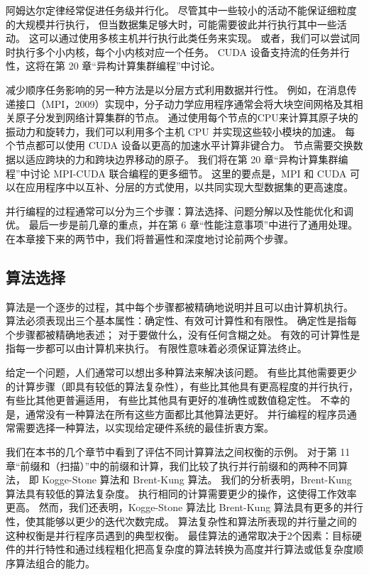阿姆达尔定律经常促进任务级并行化。 尽管其中一些较小的活动不能保证细粒度的大规模并行执行，
但当数据集足够大时，可能需要彼此并行执行其中一些活动。 这可以通过使用多核主机并行执行此类任务来实现。 
或者，我们可以尝试同时执行多个小内核，每个小内核对应一个任务。 
CUDA 设备支持流的任务并行性，这将在第 20 章“异构计算集群编程”中讨论。

减少顺序任务影响的另一种方法是以分层方式利用数据并行性。 
例如，在消息传递接口（MPI，2009）实现中，分子动力学应用程序通常会将大块空间网格及其相关原子分发到网络计算集群的节点。 
通过使用每个节点的CPU来计算其原子块的振动力和旋转力，我们可以利用多个主机 CPU 并实现这些较小模块的加速。 
每个节点都可以使用 CUDA 设备以更高的加速水平计算非键合力。 节点需要交换数据以适应跨块的力和跨块边界移动的原子。 
我们将在第 20 章“异构计算集群编程”中讨论 MPI-CUDA 联合编程的更多细节。 
这里的要点是，MPI 和 CUDA 可以在应用程序中以互补、分层的方式使用，以共同实现大型数据集的更高速度。

并行编程的过程通常可以分为三个步骤：算法选择、问题分解以及性能优化和调优。 
最后一步是前几章的重点，并在第 6 章“性能注意事项”中进行了通用处理。 
在本章接下来的两节中，我们将普遍性和深度地讨论前两个步骤。

\subsection{算法选择}
算法是一个逐步的过程，其中每个步骤都被精确地说明并且可以由计算机执行。 
算法必须表现出三个基本属性：确定性、有效可计算性和有限性。 
确定性是指每个步骤都被精确地表述； 对于要做什么，没有任何含糊之处。 
有效的可计算性是指每一步都可以由计算机来执行。 有限性意味着必须保证算法终止。

给定一个问题，人们通常可以想出多种算法来解决该问题。 
有些比其他需要更少的计算步骤（即具有较低的算法复杂性），有些比其他具有更高程度的并行执行，有些比其他更普遍适用，
有些比其他具有更好的准确性或数值稳定性。 不幸的是，通常没有一种算法在所有这些方面都比其他算法更好。 
并行编程的程序员通常需要选择一种算法，以实现给定硬件系统的最佳折衷方案。

我们在本书的几个章节中看到了评估不同计算算法之间权衡的示例。 
对于第 11 章“前缀和（扫描）”中的前缀和计算，我们比较了执行并行前缀和的两种不同算法，
即 Kogge-Stone 算法和 Brent-Kung 算法。 我们的分析表明，Brent-Kung 算法具有较低的算法复杂度。 
执行相同的计算需要更少的操作，这使得工作效率更高。 
然而，我们还表明，Kogge-Stone 算法比 Brent-Kung 算法具有更多的并行性，使其能够以更少的迭代次数完成。 
算法复杂性和算法所表现的并行量之间的这种权衡是并行程序员遇到的典型权衡。 
最佳算法的通常取决于2个因素：目标硬件的并行特性和通过线程粗化把高复杂度的算法转换为高度并行算法或低复杂度顺序算法组合的能力。

